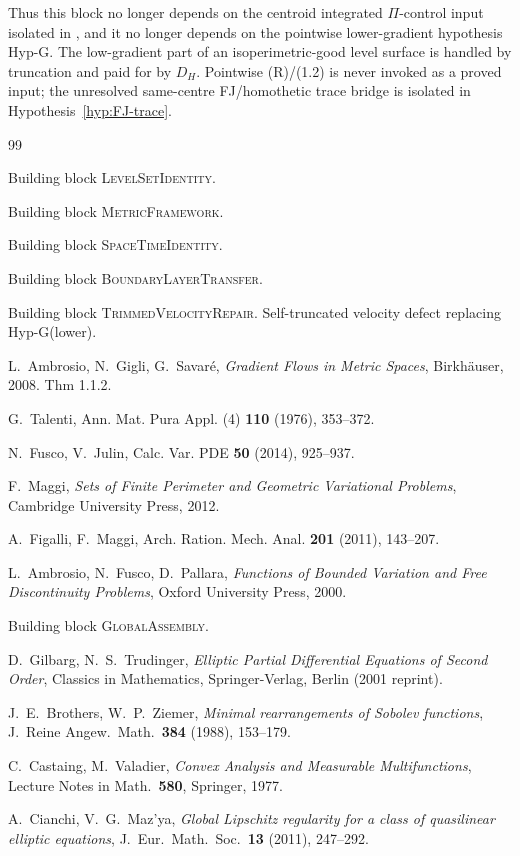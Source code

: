 \documentclass[11pt]{article}
\theoremstyle{definition}
\begin{document}
Thus this block no longer depends on the centroid integrated
\(\Pi\)-control input isolated in \cite{SpaceTimeIdentity}, and it no
longer depends on the pointwise lower-gradient hypothesis Hyp-G.  The
low-gradient part of an isoperimetric-good level surface is handled by
truncation and paid for by \(D_H\).  Pointwise (R)/(1.2) is never
invoked as a proved input; the unresolved same-centre FJ/homothetic trace
bridge is isolated in Hypothesis~\ref{hyp:FJ-trace}.

\begin{thebibliography}{99}

Building block \textsc{LevelSetIdentity}.

Building block \textsc{MetricFramework}.

Building block \textsc{SpaceTimeIdentity}.

Building block \textsc{BoundaryLayerTransfer}.

Building block \textsc{TrimmedVelocityRepair}.
Self-truncated velocity defect replacing Hyp-G(lower).

L.~Ambrosio, N.~Gigli, G.~Savar\'e, \emph{Gradient Flows in Metric
Spaces}, Birkh\"auser, 2008. Thm 1.1.2.

G.~Talenti, Ann. Mat. Pura Appl. (4) \textbf{110} (1976), 353--372.

N.~Fusco, V.~Julin, Calc. Var. PDE \textbf{50} (2014), 925--937.

F.~Maggi, \emph{Sets of Finite Perimeter and Geometric Variational
Problems}, Cambridge University Press, 2012.

A.~Figalli, F.~Maggi, Arch. Ration. Mech. Anal. \textbf{201} (2011),
143--207.

L.~Ambrosio, N.~Fusco, D.~Pallara, \emph{Functions of Bounded Variation
and Free Discontinuity Problems}, Oxford University Press, 2000.

Building block \textsc{GlobalAssembly}.

D.~Gilbarg, N.~S.~Trudinger,
\emph{Elliptic Partial Differential Equations of Second Order},
Classics in Mathematics, Springer-Verlag, Berlin (2001 reprint).

J.~E.~Brothers, W.~P.~Ziemer,
\emph{Minimal rearrangements of Sobolev functions},
J.\ Reine Angew.\ Math.\ \textbf{384} (1988), 153--179.

C.~Castaing, M.~Valadier,
\emph{Convex Analysis and Measurable Multifunctions},
Lecture Notes in Math.\ \textbf{580}, Springer, 1977.

A.~Cianchi, V.~G.~Maz'ya,
\emph{Global Lipschitz regularity for a class of quasilinear
elliptic equations}, J.~Eur.~Math.~Soc.\ \textbf{13} (2011), 247--292.

\end{thebibliography}
\end{document}

